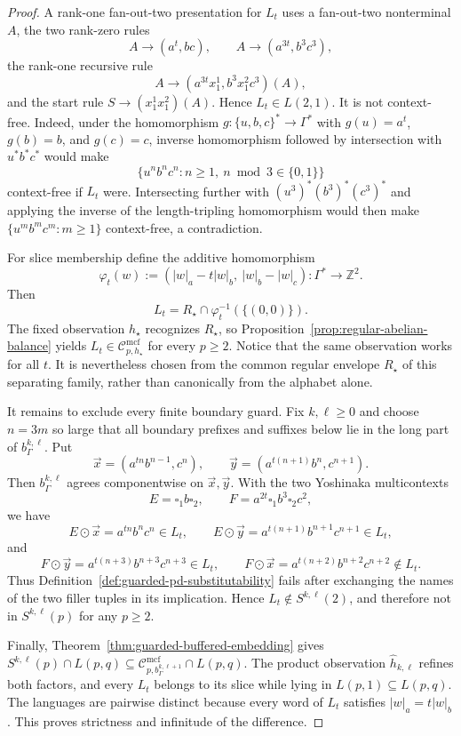 \documentclass[11pt,a4paper]{article}
\numberwithin{equation}{section}
\theoremstyle{plain}
\theoremstyle{definition}
\theoremstyle{remark}
\newcommand{\Cmcf}[2]{\mathcal{C}^{\mathrm{mcf}}_{#1,#2}}
\newcommand{\tuple}[1]{\vec{#1}}
\newcommand{\blank}{\square}
\begin{document}
\begin{proof}
A rank-one fan-out-two presentation for \(L_t\) uses a fan-out-two
nonterminal \(A\), the two rank-zero rules
\[
 A\to(a^t,bc),\qquad A\to(a^{3t},b^3c^3),
\]
the rank-one recursive rule
\[
 A\to(a^{3t}x_1^1,b^3x_1^2c^3)(A),
\]
and the start rule \(S\to(x_1^1x_1^2)(A)\).  Hence \(L_t\in L(2,1)\).
It is not context-free.  Indeed, under the homomorphism
\(g:\{u,b,c\}^*\to\Gamma^*\) with
\(g(u)=a^t\), \(g(b)=b\), and \(g(c)=c\), inverse homomorphism followed by
intersection with \(u^*b^*c^*\) would make
\[
 \{u^nb^nc^n:n\ge1,\ n\bmod3\in\{0,1\}\}
\]
context-free if \(L_t\) were.  Intersecting further with
\((u^3)^*(b^3)^*(c^3)^*\) and applying the inverse of the length-tripling
homomorphism would then make \(\{u^mb^mc^m:m\ge1\}\) context-free, a
contradiction.

For slice membership define the additive homomorphism
\[
 \varphi_t(w):=(|w|_a-t|w|_b,\ |w|_b-|w|_c):\Gamma^*\to\mathbb Z^2.
\]
Then
\[
 L_t=R_\star\cap\varphi_t^{-1}(\{(0,0)\}).
\]
The fixed observation \(h_\star\) recognizes \(R_\star\), so
Proposition~\ref{prop:regular-abelian-balance} yields
\(L_t\in\Cmcf{p}{h_\star}\) for every \(p\ge2\).  Notice that the same
observation works for all \(t\).  It is nevertheless chosen from the common
regular envelope \(R_\star\) of this separating family, rather than canonically
from the alphabet alone.

It remains to exclude every finite boundary guard.  Fix \(k,\ell\ge0\) and
choose \(n=3m\) so large that all boundary prefixes and suffixes below lie in
the long part of \(b_\Gamma^{k,\ell}\).  Put
\[
 \tuple x=(a^{tn}b^{n-1},c^n),\qquad
 \tuple y=(a^{t(n+1)}b^n,c^{n+1}).
\]
Then \(b_\Gamma^{k,\ell}\) agrees componentwise on \(\tuple x,\tuple y\).
With the two Yoshinaka multicontexts
\[
 E=\blank_1 b\blank_2,
 \qquad
 F=a^{2t}\blank_1 b^3\blank_2c^2,
\]
we have
\[
 E\odot\tuple x=a^{tn}b^nc^n\in L_t,
 \qquad
 E\odot\tuple y=a^{t(n+1)}b^{n+1}c^{n+1}\in L_t,
\]
and
\[
 F\odot\tuple y=a^{t(n+3)}b^{n+3}c^{n+3}\in L_t,
 \qquad
 F\odot\tuple x=a^{t(n+2)}b^{n+2}c^{n+2}\notin L_t.
\]
Thus Definition~\ref{def:guarded-pd-substitutability} fails after exchanging
the names of the two filler tuples in its implication.  Hence
\(L_t\notin S^{k,\ell}(2)\), and therefore not in \(S^{k,\ell}(p)\) for
any \(p\ge2\).

Finally, Theorem~\ref{thm:guarded-buffered-embedding} gives
\(S^{k,\ell}(p)\cap L(p,q)\subseteq
\Cmcf{p}{b_\Gamma^{k,\ell+1}}\cap L(p,q)\).  The product observation
\(\widehat h_{k,\ell}\) refines both factors, and every \(L_t\) belongs to
its slice while lying in \(L(p,1)\subseteq L(p,q)\).  The languages are
pairwise distinct because every word of \(L_t\) satisfies
\(|w|_a=t|w|_b\).  This proves strictness and infinitude of the difference.
\end{proof}
\end{document}
